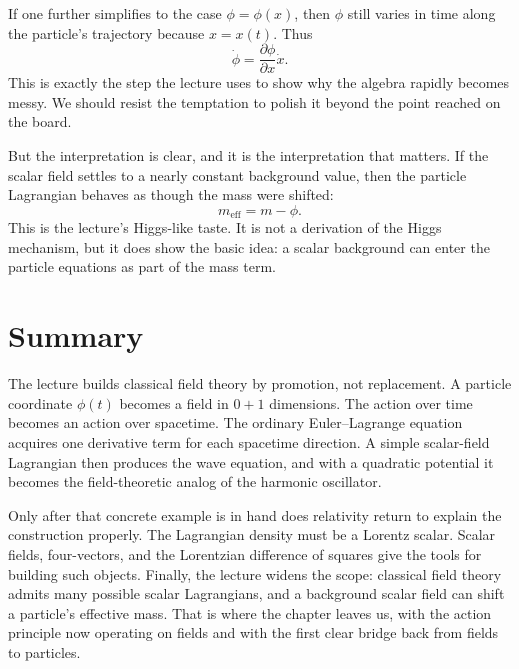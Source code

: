 If one further simplifies to the case \(\phi=\phi(x)\), then \(\phi\) still varies in time along the particle's trajectory because \(x=x(t)\). Thus
\begin{equation}
\dot\phi=\frac{\partial\phi}{\partial x}\dot x.
\end{equation}
This is exactly the step the lecture uses to show why the algebra rapidly becomes messy. We should resist the temptation to polish it beyond the point reached on the board.

But the interpretation is clear, and it is the interpretation that matters. If the scalar field settles to a nearly constant background value, then the particle Lagrangian behaves as though the mass were shifted:
\begin{equation}
m_{\mathrm{eff}}=m-\phi.
\end{equation}
This is the lecture's Higgs-like taste. It is not a derivation of the Higgs mechanism, but it does show the basic idea: a scalar background can enter the particle equations as part of the mass term.

\section{Summary}

The lecture builds classical field theory by promotion, not replacement. A particle coordinate \(\phi(t)\) becomes a field in \(0+1\) dimensions. The action over time becomes an action over spacetime. The ordinary Euler--Lagrange equation acquires one derivative term for each spacetime direction. A simple scalar-field Lagrangian then produces the wave equation, and with a quadratic potential it becomes the field-theoretic analog of the harmonic oscillator.

Only after that concrete example is in hand does relativity return to explain the construction properly. The Lagrangian density must be a Lorentz scalar. Scalar fields, four-vectors, and the Lorentzian difference of squares give the tools for building such objects. Finally, the lecture widens the scope: classical field theory admits many possible scalar Lagrangians, and a background scalar field can shift a particle's effective mass. That is where the chapter leaves us, with the action principle now operating on fields and with the first clear bridge back from fields to particles.